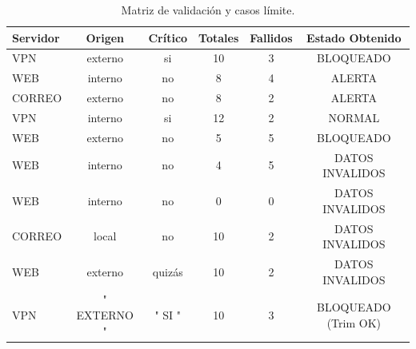 \documentclass[11pt,a4paper]{article}
\begin{document}
\begin{table}[h!]
\centering
\begin{tabular}{@{}lccccc@{}}
\toprule
\textbf{Servidor} & \textbf{Origen} & \textbf{Crítico} & \textbf{Totales} & \textbf{Fallidos} & \textbf{Estado Obtenido} \\ \midrule
VPN & externo & si & 10 & 3 & BLOQUEADO \\
WEB & interno & no & 8 & 4 & ALERTA \\
CORREO & externo & no & 8 & 2 & ALERTA \\
VPN & interno & si & 12 & 2 & NORMAL \\
WEB & externo & no & 5 & 5 & BLOQUEADO \\
WEB & interno & no & 4 & 5 & DATOS INVALIDOS \\
WEB & interno & no & 0 & 0 & DATOS INVALIDOS \\
CORREO & local & no & 10 & 2 & DATOS INVALIDOS \\
WEB & externo & quizás & 10 & 2 & DATOS INVALIDOS \\
VPN & " EXTERNO " & " SI " & 10 & 3 & BLOQUEADO (Trim OK) \\ \bottomrule
\end{tabular}
\caption{Matriz de validación y casos límite.}
\end{table}
\end{document}

